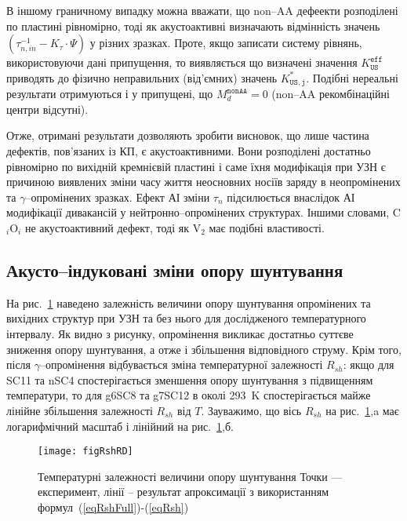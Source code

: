 В іншому граничному випадку можна вважати,
що non--AA дефеекти розподілені по пластині рівномірно,
тоді як акустоактивні визначають відмінність значень $(\tau_{n,in}^{-1}-K_\tau\cdot\Psi)$ у різних зразках.
Проте, якщо записати систему рівнянь, використовуючи дані припущення,
то виявляється що визначені значення $K_\mathtt{US}^\mathtt{eff}$
приводять до фізично неправильних (від'ємних) значень $K_\mathtt{US,j}^*$.
Подібні нереальні результати отримуються і у припущені, що $M_d^\mathtt{nonAA}=0$
(non--AA рекомбінаційні центри відсутні).

Отже, отримані результати дозволяють зробити висновок,
що лише частина дефектів, пов'язаних із КП, є акустоактивними.
Вони розподілені достатньо рівномірно по вихідній кремнієвій пластині і саме їхня модифікація
при УЗН є причиною виявлених зміни часу життя неосновних носіїв заряду в неопромінених та $\gamma$--опромінених зразках.
Ефект АІ зміни $\tau_n$ підсилюється внаслідок АІ модифікації дивакансій у нейтронно--опромінених структурах.
Іншими словами,
C$_i$O$_i$ не акустоактивний дефект, тоді як V$_2$ має подібні властивості.



\subsection{Акусто--індуковані зміни  опору шунтування\label{sbRsh}}

На рис.~\ref{figRshRD} наведено залежність величини  опору шунтування опромінених та вихідних структур
при УЗН та без нього для дослідженого температурного інтервалу.
Як видно з рисунку, опромінення викликає достатньо суттєве зниження  опору шунтування, а отже
і збільшення  відповідного струму.
Крім того, після $\gamma$--опромінення відбувається зміна температурної залежності $R_{sh}$:
якщо для SC11 та nSC4 спостерігається зменшення  опору шунтування з підвищенням температури,
то для g6SC8 та g7SC12 в околі 293~K спостерігається майже лінійне збільшення залежності
$R_{sh}$ від $T$.
Зауважимо, що вісь $R_{sh}$ на рис.~\ref{figRshRD},a має логарифмічний масштаб і лінійний на  рис.~\ref{figRshRD},б.


\begin{figure}
\center
\texttt{[image: figRshRD]}
\caption{\label{figRshRD}
Температурні залежності величини  опору шунтування
\FigCaptionSSCRD
Точки --- експеримент,
лінії -- результат апроксимації з використанням формул~(\ref{eqRshFull})-(\ref{eqRsh})
}%
\end{figure}

